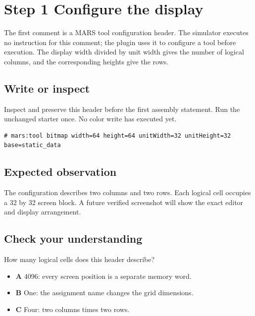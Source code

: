 \section{Step 1 Configure the
  display}\label{002-single-pixel-s01-step-1-configure-the-display}

The first comment is a MARS tool configuration header. The simulator
executes no instruction for this comment; the plugin uses it to
configure a tool before execution. The display width divided by unit
width gives the number of logical columns, and the corresponding heights
give the rows.

\subsection{Write or
  inspect}\label{002-single-pixel-s01-write-or-inspect}

Inspect and preserve this header before the first assembly statement.
Run the unchanged starter once. No color write has executed yet.

\begin{verbatim}
# mars:tool bitmap width=64 height=64 unitWidth=32 unitHeight=32 base=static_data
\end{verbatim}

\subsection{Expected
  observation}\label{002-single-pixel-s01-expected-observation}

The configuration describes two columns and two rows. Each logical cell
occupies a 32 by 32 screen block. A future verified screenshot will show
the exact editor and display arrangement.

\subsection{Check your
  understanding}\label{002-single-pixel-s01-check-your-understanding}

How many logical cells does this header describe?

\begin{itemize}
  \tightlist
  \item
        \textbf{A} 4096: every screen position is a separate memory word.
  \item
        \textbf{B} One: the assignment name changes the grid dimensions.
  \item
        \textbf{C} Four: two columns times two rows.
\end{itemize}
